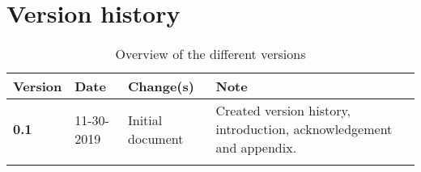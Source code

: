 \section*{Version history}


\begin{longtable}{| p{} | p{} | p{} | p{} |}

    \hline
    \textcolor{darkpink}{Version} & \textcolor{darkpink}{Date} & \textcolor{darkpink}{Change(s)} & \textcolor{darkpink}{Note} \\
     
    \hline
    \textbf{0.1} & 11-30-2019 & Initial document & Created version history, introduction, acknowledgement and appendix. \\

    \hline

    \caption{Overview of the different versions}
    \label{tab:version}

\end{longtable}
